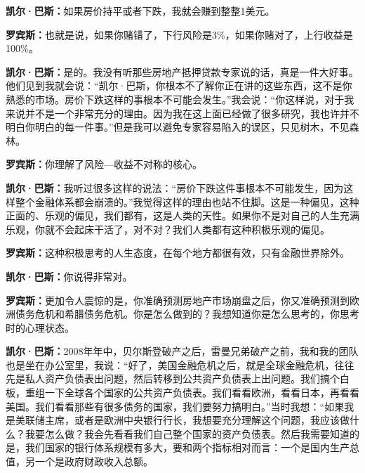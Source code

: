 \begin{BookQuote}
\textbf{凯尔·巴斯：}如果房价持平或者下跌，我就会赚到整整1美元。
\end{BookQuote}

\begin{BookQuote}
\textbf{罗宾斯：}也就是说，如果你赌错了，下行风险是3\%，如果你赌对了，上行收益是100\%。
\end{BookQuote}

\begin{BookQuote}
\textbf{凯尔·巴斯：}是的。我没有听那些房地产抵押贷款专家说的话，真是一件大好事。他们见到我就会说：“凯尔·巴斯，你根本不了解你正在讲的这些东西，这不是你熟悉的市场。房价下跌这样的事根本不可能会发生。”我会说：“你这样说，对于我来说并不是一个非常充分的理由。因为我在这上面已经做了很多研究，我也许并不明白你明白的每一件事。”但是我可以避免专家容易陷入的误区，只见树木，不见森林。
\end{BookQuote}

\begin{BookQuote}
\textbf{罗宾斯：}你理解了风险—收益不对称的核心。
\end{BookQuote}

\begin{BookQuote}
\textbf{凯尔·巴斯：}我听过很多这样的说法：“房价下跌这件事根本不可能发生，因为这样整个金融体系都会崩溃的。”我觉得这样的理由也站不住脚。这是一种偏见，这种正面的、乐观的偏见，我们都有，这是人类的天性。如果你不是对自己的人生充满乐观，你就不会起床干活了，对不对？我们人类都有这种积极乐观的偏见。
\end{BookQuote}

\begin{BookQuote}
\textbf{罗宾斯：}这种积极思考的人生态度，在每个地方都很有效，只有金融世界除外。
\end{BookQuote}

\begin{BookQuote}
\textbf{凯尔·巴斯：}你说得非常对。
\end{BookQuote}

\begin{BookQuote}
\textbf{罗宾斯：}更加令人震惊的是，你准确预测房地产市场崩盘之后，你又准确预测到欧洲债务危机和希腊债务危机。你是怎么做到的？我想知道你是怎么思考的，你思考时的心理状态。
\end{BookQuote}

\begin{BookQuote}
\textbf{凯尔·巴斯：}2008年年中，贝尔斯登破产之后，雷曼兄弟破产之前，我和我的团队也是坐在办公室里，我说：“好了，美国金融危机之后，就是全球金融危机，往往先是私人资产负债表出问题，然后转移到公共资产负债表上出问题。我们搞个白板，重组一下全球各个国家的公共资产负债表。我们看看欧洲，看看日本，再看看美国。我们看看那些有很多债务的国家，我们要努力搞明白。”当时我想：“如果我是美联储主席，或者是欧洲中央银行行长，我想要充分理解这个问题，我应该做什么？我要怎么做？我会先看看我们自己整个国家的资产负债表。然后我需要知道的是，我们国家的银行体系规模有多大，要和两个指标相对而言：一个是国内生产总值，另一个是政府财政收入总额。
\end{BookQuote}

